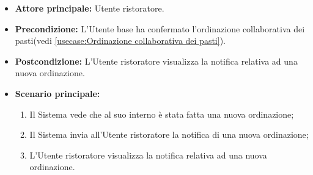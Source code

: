 \label{usecase:Visualizzaione notifica nuovo ordine}
\begin{itemize}
	\item \textbf{Attore principale:} Utente ristoratore.
	
	\item \textbf{Precondizione:} L'Utente base ha confermato l'ordinazione collaborativa dei pasti(vedi \autoref{usecase:Ordinazione collaborativa dei pasti}).

	\item \textbf{Postcondizione:} L'Utente ristoratore visualizza la notifica relativa ad una nuova ordinazione.
     
	\item \textbf{Scenario principale:}
	      \begin{enumerate}
                \item Il Sistema vede che al suo interno è stata fatta una nuova ordinazione;
                \item Il Sistema invia all'Utente ristoratore la notifica di una nuova ordinazione;
                \item L'Utente ristoratore visualizza la notifica relativa ad una nuova ordinazione.
	      \end{enumerate}
\end{itemize}